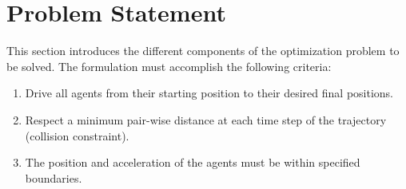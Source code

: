 \section{Problem Statement}
\label{sec:formulation}

This section introduces the different components of the optimization problem to be solved. The formulation must accomplish the following criteria:
\begin{enumerate}
	\item Drive all agents from their starting position to their desired final positions.
	\item Respect a minimum pair-wise distance at each time step of the trajectory (collision constraint).
	\item The position and acceleration of the agents must be within specified boundaries.
\end{enumerate}


